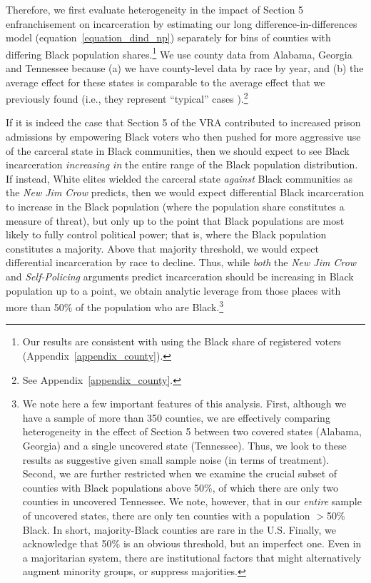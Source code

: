\documentclass[12pt]{article}
\begin{document}


Therefore, we first evaluate heterogeneity in the impact of Section 5 enfranchisement on incarceration by estimating our long difference-in-differences model (equation~\ref{equation_dind_np}) separately for bins of counties with differing Black population shares.\footnote{Our results are consistent with using the Black share of registered voters (Appendix~\ref{appendix_county}).} We use county data from Alabama, Georgia and Tennessee because (a) we have county-level data by race by year, and (b) the average effect for these states is comparable to the average effect that we previously found (i.e., they represent ``typical'' cases \citep{Seawright:2008us}).\footnote{See Appendix~\ref{appendix_county}.}

If it is indeed the case that Section 5 of the VRA contributed to increased prison admissions by empowering Black voters who then pushed for more aggressive use of the carceral state in Black communities, then we should expect to see Black incarceration \emph{increasing in} the entire range of the Black population distribution.  If instead, White elites wielded the carceral state \emph{against} Black communities as the \emph{New Jim Crow} predicts, then we would expect differential Black incarceration to increase in the Black population (where the population share constitutes a measure of threat), but only up to the point that Black populations are most likely to fully control political power; that is, where the Black population constitutes a majority.  Above that majority threshold, we would expect differential incarceration by race to decline.  Thus, while \emph{both} the \emph{New Jim Crow} and \emph{Self-Policing} arguments predict incarceration should be increasing in Black population up to a point, we obtain analytic leverage from those places with more than 50\% of the population who are Black.\footnote{We note here a few important features of this analysis.  First, although we have a sample of more than 350 counties, we are effectively comparing heterogeneity in the effect of Section 5 between two covered states (Alabama, Georgia) and a single uncovered state (Tennessee).  Thus, we look to these results as suggestive given small sample noise (in terms of treatment).  Second, we are further restricted when we examine the crucial subset of counties with Black populations above 50\%, of which there are only two counties in uncovered Tennessee.  We note, however, that in our \emph{entire} sample of uncovered states, there are only ten counties with a population $>$50\% Black.  In short, majority-Black counties are rare in the U.S. Finally, we acknowledge that 50\% is an obvious threshold, but an imperfect one.  Even in a majoritarian system, there are institutional factors that might alternatively augment minority groups, or suppress majorities.}
\end{document}
